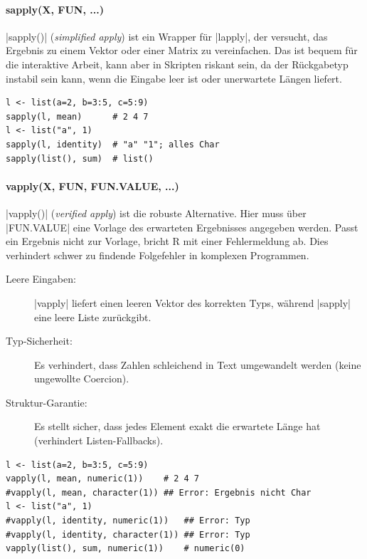 \documentclass[10pt,twocolumn]{scrartcl}
\renewcommand{\lstinline}{\mycoloredinline}
\begin{document}
\paragraph{sapply(X, FUN, ...)}

\lstinline|sapply()| (\emph{simplified apply}) ist ein Wrapper für \lstinline|lapply|, der versucht, das Ergebnis zu einem Vektor oder einer Matrix zu vereinfachen. Das ist bequem für die interaktive Arbeit, kann aber in Skripten riskant sein, da der Rückgabetyp instabil sein kann, wenn die Eingabe leer ist oder unerwartete Längen liefert.

\begin{lstlisting}
l <- list(a=2, b=3:5, c=5:9)
sapply(l, mean)      # 2 4 7
l <- list("a", 1)
sapply(l, identity)  # "a" "1"; alles Char
sapply(list(), sum)  # list()
\end{lstlisting}

\paragraph{vapply(X, FUN, FUN.VALUE, ...)}

\lstinline|vapply()| (\emph{verified apply}) ist die robuste Alternative. Hier muss über \lstinline|FUN.VALUE| eine Vorlage des erwarteten Ergebnisses angegeben werden. Passt ein Ergebnis nicht zur Vorlage, bricht R mit einer Fehlermeldung ab. Dies verhindert schwer zu findende Folgefehler in komplexen Programmen.

\begin{description}
\item[Leere Eingaben:] \lstinline|vapply| liefert einen leeren Vektor des korrekten Typs, während \lstinline|sapply| eine leere Liste zurückgibt.
\item[Typ-Sicherheit:] Es verhindert, dass Zahlen schleichend in Text umgewandelt werden (keine ungewollte Coercion).
\item[Struktur-Garantie:] Es stellt sicher, dass jedes Element exakt die erwartete Länge hat (verhindert Listen-Fallbacks).
\end{description}

\begin{lstlisting}
l <- list(a=2, b=3:5, c=5:9)
vapply(l, mean, numeric(1))    # 2 4 7
#vapply(l, mean, character(1)) ## Error: Ergebnis nicht Char
l <- list("a", 1)
#vapply(l, identity, numeric(1))   ## Error: Typ
#vapply(l, identity, character(1)) ## Error: Typ
vapply(list(), sum, numeric(1))    # numeric(0)
\end{lstlisting}
\end{document}
